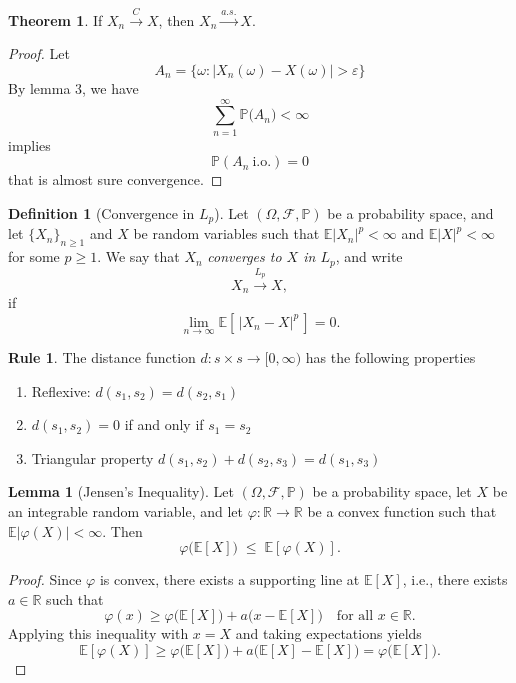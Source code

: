 \documentclass[11pt]{article}
\theoremstyle{definition}
\newtheorem{defn}{Definition}[section]
\newtheorem{reg}{Rule}[section]
\newtheorem{lemma}{Lemma}[section]
\newtheorem{theo}{Theorem}[section]
\begin{document}
\begin{theo}
If \(X_n \xrightarrow{C} X\), then \(X_n \xrightarrow{a.s.} X\).
\end{theo}
\begin{proof}
    Let
    $$
    A_n = \{\omega:|X_n(\omega) - X(\omega)| > \varepsilon\} 
    $$
    By lemma 3, we have
    \[
\sum_{n=1}^{\infty} \mathbb{P}\bigl( A_n\bigr) < \infty
\]
 implies
    \[
    \mathbb P(A_n \ \text{i.o.}) = 0
    \]
that is almost sure convergence.
\end{proof}

\begin{defn}[Convergence in $L_p$]
Let $(\Omega,\mathcal{F},\mathbb{P})$ be a probability space, and let
$\{X_n\}_{n\ge 1}$ and $X$ be random variables such that
$\mathbb{E}|X_n|^p < \infty$ and $\mathbb{E}|X|^p < \infty$ for some
$p \ge 1$.
We say that $X_n$ \emph{converges to $X$ in $L_p$}, and write
\[
X_n \xrightarrow{L_p} X,
\]
if
\[
\lim_{n\to\infty} \mathbb{E}\!\left[\,|X_n - X|^p\,\right] = 0.
\]
\end{defn}
\begin{reg}
    The distance function $d: s\times s\rightarrow [0, \infty)$ has the following properties
    \begin{enumerate}
        \item Reflexive: $d(s_1, s_2) = d(s_2, s_1)$
        \item $d(s_1, s_2) = 0$ if and only if $s_1 = s_2$
        \item Triangular property $d(s_1, s_2) + d(s_2, s_3) = d(s_1, s_3)$
    \end{enumerate}
\end{reg}

\begin{lemma}[Jensen's Inequality]
Let $(\Omega,\mathcal{F},\mathbb{P})$ be a probability space, let
$X$ be an integrable random variable, and let
$\varphi:\mathbb{R}\to\mathbb{R}$ be a convex function such that
$\mathbb{E}|\varphi(X)|<\infty$.
Then
\[
\varphi\!\big(\mathbb{E}[X]\big)
\;\le\;
\mathbb{E}\!\left[\varphi(X)\right].
\]
\end{lemma}

\begin{proof}
Since $\varphi$ is convex, there exists a supporting line at
$\mathbb{E}[X]$, i.e., there exists $a\in\mathbb{R}$ such that
\[
\varphi(x) \ge \varphi\!\big(\mathbb{E}[X]\big)
+ a\big(x-\mathbb{E}[X]\big)
\quad \text{for all } x\in\mathbb{R}.
\]
Applying this inequality with $x=X$ and taking expectations yields
\[
\mathbb{E}[\varphi(X)]
\ge
\varphi\!\big(\mathbb{E}[X]\big)
+ a\big(\mathbb{E}[X]-\mathbb{E}[X]\big)
=
\varphi\!\big(\mathbb{E}[X]\big).
\]
\end{proof}
\end{document}
